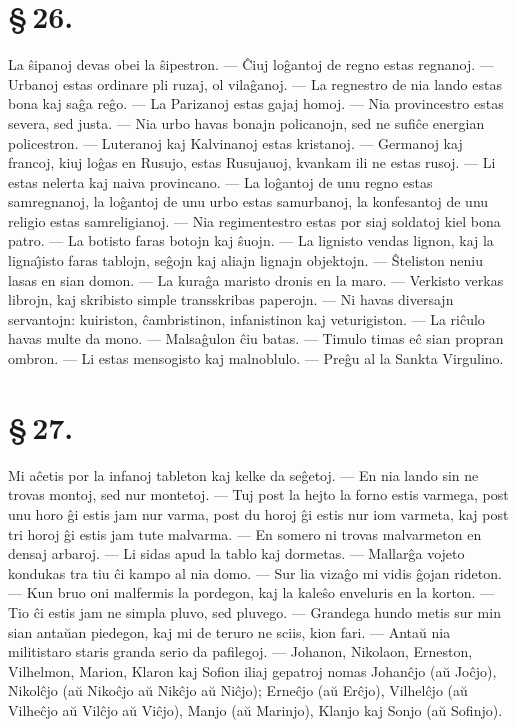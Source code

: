 \section*{\S\,26.}
La \^sipanoj devas obei la \^sipestron. --- \^Ciuj lo\^gantoj de
regno estas regnanoj. --- Urbanoj estas ordinare pli ruzaj, ol
vila\^ganoj. --- La regnestro de nia lando estas bona kaj sa\^ga
re\^go. --- La Parizanoj estas gajaj homoj. --- Nia provincestro
estas severa, sed justa. --- Nia urbo havas bonajn policanojn, sed
ne sufi\^ce energian policestron. --- Luteranoj kaj Kalvinanoj estas
kristanoj. --- Germanoj kaj francoj, kiuj lo\^gas en Rusujo, estas
Rusujauoj, kvankam ili ne estas rusoj. --- Li estas nelerta kaj
naiva provincano. --- La lo\^gantoj de unu regno estas samregnanoj,
la lo\^gantoj de unu urbo estas samurbanoj, la konfesantoj de unu
religio estas samreligianoj. --- Nia regimentestro estas por siaj
soldatoj kiel bona patro. --- La botisto faras botojn kaj \^suojn.
--- La lignisto vendas lignon, kaj la ligna\^{\j}isto faras tablojn,
se\^gojn kaj aliajn lignajn objektojn. --- \^Steliston neniu lasas
en sian domon. --- La kura\^ga maristo dronis en la maro. ---
Verkisto verkas librojn, kaj skribisto simple transskribas paperojn.
--- Ni havas diversajn servantojn: kuiriston, \^cambristinon,
infanistinon kaj veturigiston. --- La ri\^culo havas multe da mono.
--- Malsa\^gulon \^ciu batas. --- Timulo timas e\^c sian propran
ombron. --- Li estas mensogisto kaj malnoblulo. --- Pre\^gu al la
Sankta Virgulino.

\section*{\S\,27.}
Mi a\^cetis por la infanoj tableton kaj kelke da se\^getoj. --- En
nia lando sin ne trovas montoj, sed nur montetoj. --- Tuj post la
hejto la forno estis varmega, post unu horo \^gi estis jam nur
varma, post du horoj \^gi estis nur iom varmeta, kaj post tri horoj
\^gi estis jam tute malvarma. --- En somero ni trovas malvarmeton en
densaj arbaroj. --- Li sidas apud la tablo kaj dormetas.
--- Mallar\^ga vojeto kondukas tra tiu \^ci kampo al nia domo. --- Sur
lia viza\^go mi vidis \^gojan rideton. --- Kun bruo oni malfermis la
pordegon, kaj la kale\^so enveluris en la korton. --- Tio \^ci estis
jam ne simpla pluvo, sed pluvego. --- Grandega hundo metis sur min
sian anta\u uan piedegon, kaj mi de teruro ne sciis, kion fari.
--- Anta\u u nia militistaro staris granda serio da pafilegoj.
 --- Johanon, Nikolaon, Erneston, Vilhelmon, Marion, Klaron kaj Sofion
iliaj gepatroj nomas Johan\^cjo (a\u u Jo\^cjo), Nikol\^cjo (a\u u
Niko\^cjo a\u u Nik\^cjo a\u u Ni\^cjo); Erne\^cjo (a\u u Er\^cjo),
Vilhel\^cjo (a\u u Vilhe\^cjo a\u u Vil\^cjo a\u u Vi\^cjo), Manjo
(a\u u Marinjo), Klanjo kaj Sonjo (a\u u Sofinjo).


